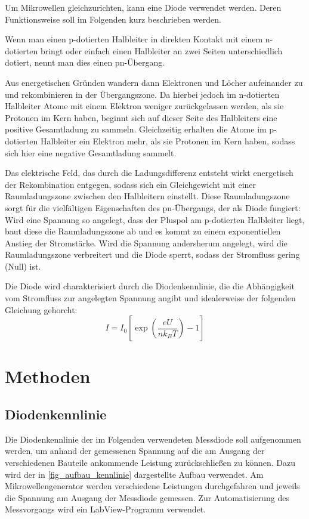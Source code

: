 \documentclass[
	a4paper,
	12pt,
	pagesize,
	ngerman
]{scrartcl}
\begin{document}
	Um Mikrowellen gleichzurichten, kann eine Diode verwendet werden.
	Deren Funktionsweise soll im Folgenden kurz beschrieben werden.

	Wenn man einen p-dotierten Halbleiter in direkten Kontakt mit einem n-dotierten bringt oder einfach einen Halbleiter an zwei Seiten unterschiedlich dotiert, nennt man dies einen pn-Übergang.

	Aus energetischen Gründen wandern dann Elektronen und Löcher aufeinander zu und rekombinieren in der Übergangszone.
	Da hierbei jedoch im n-dotierten Halbleiter Atome mit einem Elektron weniger zurückgelassen werden, als sie Protonen im Kern haben, beginnt sich auf dieser Seite des Halbleiters eine positive Gesamtladung zu sammeln.
	Gleichzeitig erhalten die Atome im p-dotierten Halbleiter ein Elektron mehr, als sie Protonen im Kern haben, sodass sich hier eine negative Gesamtladung sammelt.

	Das elektrische Feld, das durch die Ladungsdifferenz entsteht wirkt energetisch der Rekombination entgegen, sodass sich ein Gleichgewicht mit einer Raumladungszone zwischen den Halbleitern einstellt.
	Diese Raumladungszone sorgt für die vielfältigen Eigenschaften des pn-Übergangs, der als Diode fungiert:
	Wird eine Spannung so angelegt, dass der Pluspol am p-dotierten Halbleiter liegt, baut diese die Raumladungszone ab und es kommt zu einem exponentiellen Anstieg der Stromstärke.
	Wird die Spannung andersherum angelegt, wird die Raumladungszone verbreitert und die Diode sperrt, sodass der Stromfluss gering (Null) ist.

	Die Diode wird charakterisiert durch die Diodenkennlinie, die die Abhängigkeit vom Stromfluss zur angelegten Spannung angibt und idealerweise der folgenden Gleichung gehorcht:
	\begin{equation}
		\label{eq_diode_ideal}
		I = I_0 \left[ \exp \left( \frac{eU}{n k_B T} \right) -1 \right]
	\end{equation}


	\section{Methoden}

	\subsection{Diodenkennlinie}
	Die Diodenkennlinie der im Folgenden verwendeten Messdiode soll aufgenommen werden, um anhand der gemessenen Spannung auf die am Ausgang der verschiedenen Bauteile ankommende Leistung zurückschließen zu können.
	Dazu wird der in \cref{fig_aufbau_kennlinie} dargestellte Aufbau verwendet.
	Am Mikrowellengenerator werden verschiedene Leistungen durchgefahren und jeweils die Spannung am Ausgang der Messdiode gemessen.
	Zur Automatisierung des Messvorgangs wird ein LabView-Programm verwendet.
\end{document}
